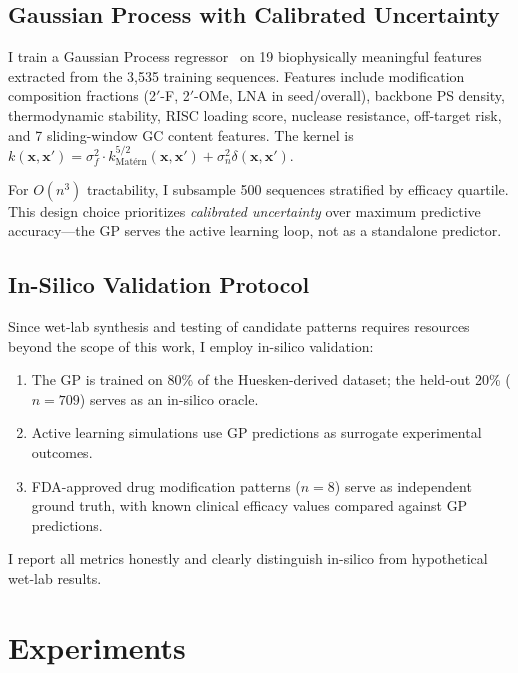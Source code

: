 \documentclass{article}
\begin{document}
\subsection{Gaussian Process with Calibrated Uncertainty}

I train a Gaussian Process regressor~\citep{rasmussen2006} on 19 biophysically meaningful features extracted from the 3,535 training sequences. Features include modification composition fractions (2$'$-F, 2$'$-OMe, LNA in seed/overall), backbone PS density, thermodynamic stability, RISC loading score, nuclease resistance, off-target risk, and 7 sliding-window GC content features. The kernel is $k(\mathbf{x}, \mathbf{x}') = \sigma_f^2 \cdot k_\text{Mat\'{e}rn}^{5/2}(\mathbf{x}, \mathbf{x}') + \sigma_n^2 \delta(\mathbf{x}, \mathbf{x}')$.

For $O(n^3)$ tractability, I subsample 500 sequences stratified by efficacy quartile. This design choice prioritizes \emph{calibrated uncertainty} over maximum predictive accuracy---the GP serves the active learning loop, not as a standalone predictor.

\subsection{In-Silico Validation Protocol}

Since wet-lab synthesis and testing of candidate patterns requires resources beyond the scope of this work, I employ in-silico validation:
\begin{enumerate}
  \item The GP is trained on 80\% of the Huesken-derived dataset; the held-out 20\% ($n=709$) serves as an in-silico oracle.
  \item Active learning simulations use GP predictions as surrogate experimental outcomes.
  \item FDA-approved drug modification patterns ($n=8$) serve as independent ground truth, with known clinical efficacy values compared against GP predictions.
\end{enumerate}
I report all metrics honestly and clearly distinguish in-silico from hypothetical wet-lab results.


\section{Experiments}
\end{document}
